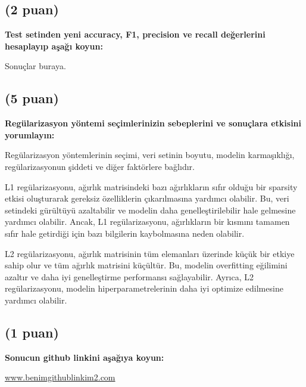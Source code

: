 \documentclass[11pt]{article}
\begin{document}
\subsection{(2 puan)} \textbf{Test setinden yeni accuracy, F1, precision ve recall değerlerini hesaplayıp aşağı koyun:}

Sonuçlar buraya.

\subsection{(5 puan)} \textbf{Regülarizasyon yöntemi seçimlerinizin sebeplerini ve sonuçlara etkisini yorumlayın:}

Regülarizasyon yöntemlerinin seçimi, veri setinin boyutu, modelin karmaşıklığı, regülarizasyonun şiddeti ve diğer faktörlere bağlıdır.

L1 regülarizasyonu, ağırlık matrisindeki bazı ağırlıkların sıfır olduğu bir sparsity etkisi oluşturarak gereksiz özelliklerin çıkarılmasına yardımcı olabilir. Bu, veri setindeki gürültüyü azaltabilir ve modelin daha genelleştirilebilir hale gelmesine yardımcı olabilir. Ancak, L1 regülarizasyonu, ağırlıkların bir kısmını tamamen sıfır hale getirdiği için bazı bilgilerin kaybolmasına neden olabilir.

L2 regülarizasyonu, ağırlık matrisinin tüm elemanları üzerinde küçük bir etkiye sahip olur ve tüm ağırlık matrisini küçültür. Bu, modelin overfitting eğilimini azaltır ve daha iyi genelleştirme performansı sağlayabilir. Ayrıca, L2 regülarizasyonu, modelin hiperparametrelerinin daha iyi optimize edilmesine yardımcı olabilir.

\subsection{(1 puan)} \textbf{Sonucun github linkini  aşağıya koyun:}

\url{www.benimgithublinkim2.com}
\end{document}
